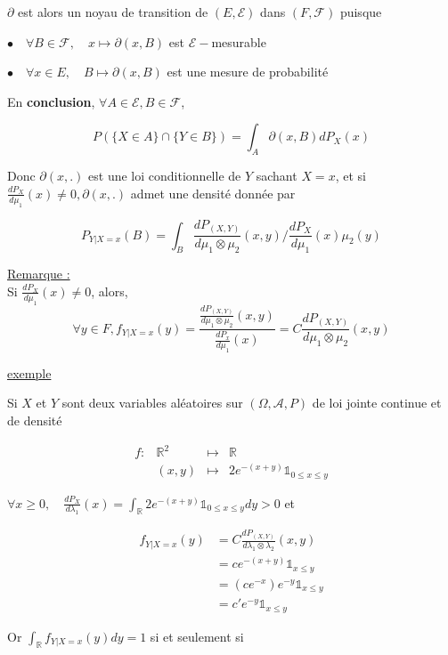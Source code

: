 \documentclass[12pt]{article}
\newcommand{\petitespace}{\vspace{0.5cm}}
\newcommand{\shift}{\hspace{2em}}
\newcommand{\bb}[1]{\mathbb{#1}} %
\newcommand{\R}{\bb{R}} %
\renewcommand{\d}{\partial} %
\newcommand{\Rq}{\underline{Remarque :} \\}
\renewcommand{\cal}{\mathcal}
\newcommand{\EE}{(E, \mathcal E)} %
\newcommand{\FF}{(F, \mathcal F)} %
\newcommand{\OmegaAP}{(\Omega, \mathcal A, P)} %
\newcommand{\1}{\bb{1}} %
\begin{document}
{\petitespace

$\d$ est alors un noyau de transition de $\EE$ dans $\FF$ puisque \petitespace

\shift $\bullet \quad \forall B \in \cal F, \quad x \mapsto \d(x,B)$ est $\cal E-$mesurable  \petitespace

\shift $\bullet \quad \forall x \in E, \quad B \mapsto \d(x,B)$ est une mesure de probabilité \petitespace

En \textbf{conclusion}, $\forall A \in \cal E, B \in \cal F$, 

$$P(\{X \in A\} \cap \{ Y \in B\})  = \int_A \d(x,B) dP_X(x)$$\petitespace

Donc $\d(x,.)$ est une loi conditionnelle de $Y$ sachant $X=x$, et si $\frac{d P_X}{d \mu_1}(x) \ne 0, \d(x,.)$ admet une densité donnée par 

$$P_{Y|X=x}(B) = \int_B \frac{dP_{(X,Y)}}{d \mu_1 \otimes \mu_2}(x,y)/ \frac{dP_X}{d\mu_1}(x)\mu_2(y) $$

\Rq 

Si $\frac{dP_X}{d\mu_1}(x) \ne 0$, alors, {\Large $$\forall y \in F, f_{Y|X=x}(y) = \frac{ \frac{dP_{(X,Y)}}{d \mu_1\otimes \mu_2}(x,y)}{ \frac{dP_x}{d \mu_1}(x)} = C\frac{dP_{(X,Y)}}{d \mu_1\otimes \mu_2}(x,y) $$ }
}




\underline{exemple}\petitespace

Si $X$ et $Y$ sont deux variables aléatoires sur $\OmegaAP$ de loi jointe continue et de densité 

$$\begin{array}{rrrl} %

  f :&   \R^2 &\mapsto& \R\\
  & (x,y) & \mapsto &2e^{-(x+y)}\1_{0 \le x \le y }
\end{array}
$$\petitespace

$\forall x \ge 0, \quad \frac{dP_X}{d\lambda_1}(x) =\int_\R 2e^{-(x+y)}\1_{0 \le x \le y }dy >0$ et

 
\begin{align*}
	f_{Y|X=x}(y)&= C\frac{dP_{(X,Y)}}{d\lambda_1 \otimes \lambda_2}(x,y)\\
	&=ce^{-(x+y)}\1_{x \le y}\\
	&=(ce^{-x})e^{-y}\1_{x \le y}\\
	&=c'e^{-y}\1_{x \le y}
\end{align*}

Or $\int_\R f_{Y|X=x}(y)dy =1$ si et seulement si
\end{document}
